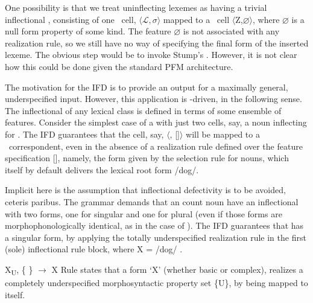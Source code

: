 \documentclass[output=paper,colorlinks,citecolor=brown]{langscibook}
\begin{document}
\sloppy
One possibility is that we treat uninflecting lexemes as having a trivial inflectional , consisting of one \PC\ cell, $\langle$$\mathcal{L},\sigma$$\rangle$ mapped to a \PF\ cell $\langle$Z,$\varnothing$$\rangle$, where $\varnothing$ is a null form property of some kind. The feature $\varnothing$ is not associated with any realization rule, so we still have no way of specifying the final form of the inserted lexeme. The obvious step would be to invoke Stump's . However, it is not clear how this could be done given the standard PFM architecture.

The motivation for the IFD is to provide an output for a maximally general, underspecified input. However, this application is -driven, in the following sense. The inflectional  of any lexical class is defined in terms of some ensemble of features. Consider the simplest case of a  with just two cells, say, a noun inflecting for . The IFD guarantees that the cell, say, $\langle$, []$\rangle$ will be mapped to a \PF\ correspondent, even in the absence of a realization rule defined over the feature specification [], namely, the form given by the  selection rule for  nouns, which itself by default delivers the lexical root form /dog/. 

Implicit here is the assumption that inflectional defectivity is to be avoided, ceteris paribus. The grammar demands that an  count noun have an inflectional  with two forms, one for singular and one for plural (even if those forms are morphophonologically identical, as in the case of ). The IFD guarantees that  has a singular form,  by applying the totally underspecified realization rule  in the first (sole) inflectional rule block, where X = /dog/ \citep[cf. ][465]{bonamistump2016}. 

\ea\label{IFDRR}
X\textsubscript{U}, \{ \} $\rightarrow$ X 
\z
Rule  states that a form `X' (whether basic or complex),   realizes a completely underspecified morphosyntactic property set \{U\}, by being mapped to itself. 
\end{document}
